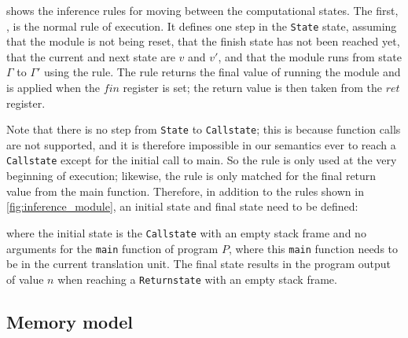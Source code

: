 shows the inference rules for moving between the
computational states.  The first, , is the normal rule
of execution.  It defines one step in the \texttt{State} state, assuming that
the module is not being reset, that the finish state has not been reached yet,
that the current and next state are $v$ and $v'$, and that the module runs from
state $\Gamma$ to $\Gamma'$ using the  rule.  The
 rule returns the final value of running the module
and is applied when the $\mathit{fin}$ register is set; the return value is then
taken from the $\mathit{ret}$ register.

Note that there is no step from \texttt{State} to \texttt{Callstate}; this is
because function calls are not supported, and it is therefore impossible in our
semantics ever to reach a \texttt{Callstate} except for the initial call to
main. So the  rule is only used at the very beginning
of execution; likewise, the  rule is only matched for
the final return value from the main function.  Therefore, in addition to the
rules shown in \cref{fig:inference_module}, an initial state and final state
need to be defined:


\noindent where the initial state is the \texttt{Callstate} with an empty stack
frame and no arguments for the \texttt{main} function of program $P$, where this
\texttt{main} function needs to be in the current translation unit.  The final
state results in the program output of value $n$ when reaching a
\texttt{Returnstate} with an empty stack frame.

\subsection{Memory model}\label{sec:verilog:memory}

